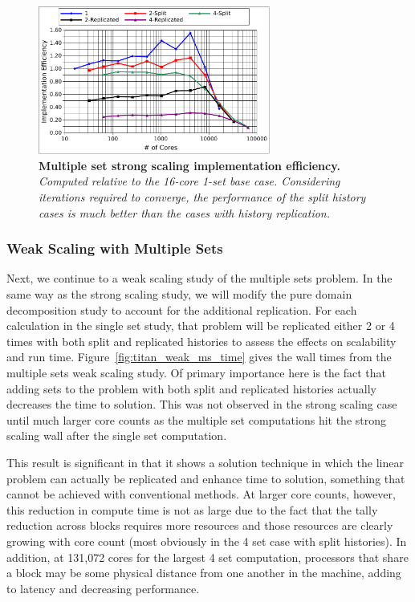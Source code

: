 \documentclass{snamc2013}
\begin{document}
\begin{figure}[h!]
  \begin{center}
    \includegraphics[width=3in]{titan_strong_ms_impeff.pdf}
  \end{center}
  \caption{\textbf{Multiple set strong scaling implementation
      efficiency.} \textit{Computed relative to the 16-core 1-set base
      case. Considering iterations required to converge, the
      performance of the split history cases is much better than the
      cases with history replication.}}
  \label{fig:titan_strong_ms_impeff}
\end{figure}

\subsubsection{Weak Scaling with Multiple Sets}
\label{subsubsec:ms_weak}
Next, we continue to a weak scaling study of the multiple sets
problem. In the same way as the strong scaling study, we will modify
the pure domain decomposition study to account for the additional
replication. For each calculation in the single set study, that
problem will be replicated either 2 or 4 times with both split and
replicated histories to assess the effects on scalability and
run time. Figure~\ref{fig:titan_weak_ms_time} gives the wall times from
the multiple sets weak scaling study. Of primary importance here is
the fact that adding sets to the problem with both split and
replicated histories actually decreases the time to solution. This was
not observed in the strong scaling case until much larger core counts
as the multiple set computations hit the strong scaling wall after the
single set computation.

This result is significant in that it shows a solution technique in
which the linear problem can actually be replicated and enhance time
to solution, something that cannot be achieved with conventional
methods. At larger core counts, however, this reduction in compute
time is not as large due to the fact that the tally reduction across
blocks requires more resources and those resources are clearly growing
with core count (most obviously in the 4 set case with split
histories). In addition, at 131,072 cores for the largest 4 set
computation, processors that share a block may be some physical
distance from one another in the machine, adding to latency and
decreasing performance.
\end{document}
